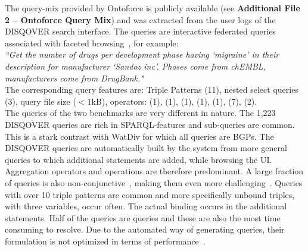 %


The query-mix provided by Ontoforce is publicly available (see \textbf{Additional File 2 -- Ontoforce Query Mix}) and was extracted from the user logs of the DISQOVER search interface. 
The queries are interactive federated queries associated with faceted browsing~\cite{Ferre, Oren}, for example:\\

\textit{``Get the number of drugs per development phase having `migraine'
in their description for manufacturer `Sandoz inc'. Phases come
from chEMBL, \\ manufacturers come from DrugBank."} \\

The corresponding query features are: Triple Patterns (11), nested select queries (3), query file size ($<1$kB), operators:  (1), (1), (1), (1), (1), (7), (2).  \\


The queries of the two benchmarks are very different in nature. 
The 1,223 DISQOVER queries are rich in SPARQL-features and sub-queries are common. This is a stark contrast with WatDiv for which all queries are BGPs.
The DISQOVER queries are automatically built by the system from more general queries to which additional  statements are added, while browsing the UI.
Aggregation operators and  operations are therefore predominant. A large fraction of queries is also non-conjunctive~\cite{conjunctive}, making them even more challenging~\cite{Picalausa2011}.
Queries with over 10 triple patterns are common and more specifically unbound triples, with three variables, occur often. The actual binding occurs in the additional  statements. Half of the queries are  queries and these are also the most time consuming to resolve. 
Due to the automated way of generating queries, their formulation is not optimized in terms of performance~\cite{Groth}. 
